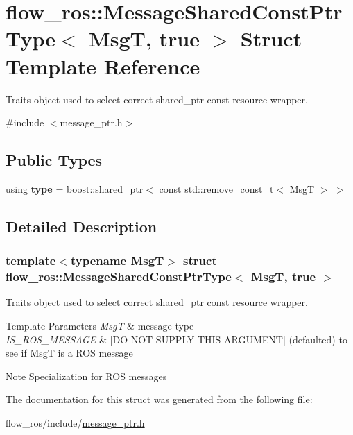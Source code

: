 \hypertarget{structflow__ros_1_1_message_shared_const_ptr_type_3_01_msg_t_00_01true_01_4}{}\section{flow\+\_\+ros\+:\+:Message\+Shared\+Const\+Ptr\+Type$<$ MsgT, true $>$ Struct Template Reference}
\label{structflow__ros_1_1_message_shared_const_ptr_type_3_01_msg_t_00_01true_01_4}


Traits object used to select correct shared\+\_\+ptr const resource wrapper.  




{\ttfamily \#include $<$message\+\_\+ptr.\+h$>$}

\subsection*{Public Types}
\begin{DoxyCompactItemize}
\item 
\mbox{\label{structflow__ros_1_1_message_shared_const_ptr_type_3_01_msg_t_00_01true_01_4_a9e1cf8f521bb65087550c9c9c1c7f5fd}} 
using {\bfseries type} = boost\+::shared\+\_\+ptr$<$ const std\+::remove\+\_\+const\+\_\+t$<$ MsgT $>$ $>$
\end{DoxyCompactItemize}


\subsection{Detailed Description}
\subsubsection*{template$<$typename MsgT$>$\newline
struct flow\+\_\+ros\+::\+Message\+Shared\+Const\+Ptr\+Type$<$ Msg\+T, true $>$}

Traits object used to select correct shared\+\_\+ptr const resource wrapper. 


\begin{DoxyTemplParams}{Template Parameters}
{\em MsgT} & message type \\
\hline
{\em I\+S\+\_\+\+R\+O\+S\+\_\+\+M\+E\+S\+S\+A\+GE} & \mbox{[}DO N\+OT S\+U\+P\+P\+LY T\+H\+IS A\+R\+G\+U\+M\+E\+NT\mbox{]} (defaulted) to see if MsgT is a R\+OS message \\
\hline
\end{DoxyTemplParams}
\begin{DoxyNote}{Note}
Specialization for R\+OS messages 
\end{DoxyNote}


The documentation for this struct was generated from the following file\+:\begin{DoxyCompactItemize}
\item 
flow\+\_\+ros/include/\hyperlink{message__ptr_8h}{message\+\_\+ptr.\+h}\end{DoxyCompactItemize}
